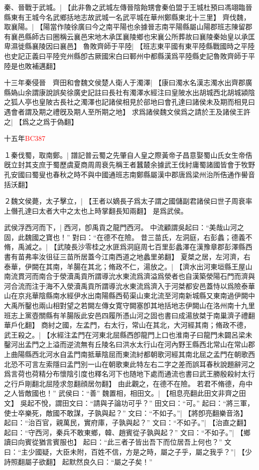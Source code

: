 秦、晉戰于武城。|{
	【此非魯之武城左傳晉陰飴甥會秦伯盟于王城杜預曰馮翊臨晉縣東有王城今名武鄉括地志故武城一名武平城在華州鄭縣東北十三里】}
齊伐魏，取襄陽。|{
	【陽當作陵徐廣曰今之南平陽也余據晉志南平陽縣屬山陽郡班志陳留郡有襄邑縣師古曰圈稱云襄邑宋地木承匡襄陵鄉也宋襄公所葬故曰襄陵秦始皇以承匡卑濕徙縣襄陵因曰襄邑】}
魯敗齊師于平陸|{
	【班志東平國有東平陸縣戰國時之平陸也史記正義曰平陸兖州縣卽古厥國宋白曰鄆州中都縣漢爲平陸縣史記魯敗齊師于平陸是也敗補邁翻】}
\par
十三年秦侵晉　齊田和會魏文侯楚人衛人于濁澤|{
	【康曰濁水名漢志濁水出齊郡廣縣媯山余謂康說誤矣徐廣史記註曰長社有濁澤水經注曰皇陂水出胡城西北胡城潁陰之狐人亭也皇陂古長社之濁澤也記諸侯相見於郤地曰會孔達曰諸侯未及期而相見曰遇會者謂及期之禮旣及期人至所期之地】}
求爲諸侯魏文侯爲之請於王及諸侯王許之|{
	【爲之之爲于偽翻】}

十五年\textcolor{red}{\small{}BC387}

１秦伐蜀，取南鄭。|{
	譜記普云蜀之先肇自人皇之際黃帝子昌意娶蜀山氏女生帝俈旣立封其支庶于蜀歷虞夏商周周衰先稱王者蠶樷余據武王伐紂庸蜀諸國皆會于牧野孔安國曰蜀叟也春秋之時不與中國通班志南鄭縣屬漢中郡唐爲梁州治所俈通作嚳音括沃翻】
	}


２魏文侯薨，太子擊立，|{
	【王者以嫡長子爲太子謂之國儲副君諸侯曰世子周衰率上僭孔達曰太者大中之太也上時掌翻長知兩翻】}
是爲武侯。

武侯浮西河而下，|{
	西河，卽禹貢之龍門西河。
	}
中流顧謂吳起曰：“美哉山河之固，此魏國之寶也！”
對曰：“在德不在險。
	昔三苗氏，左洞庭，右彭蠡；德義不脩，禹滅之。|{
	【武陵長沙零桂之水匪爲洞庭周七百里彭蠡澤在漢豫章郡彭澤縣西書有苗弗率汝徂征三苗所居蓋今江南西道之地蠡里弟翻】}
	夏桀之居，左河濟，右泰華，伊闕在其南，羊腸在其北；脩政不仁，湯放之。|{
	【濟水出河東垣縣王屋山南流貫河而南合于滎瀆禹貢所謂導沇水東流爲濟溢爲滎者也自漢築滎陽石門而濟與河合流而注于海不入滎瀆禹貢所謂導沇水東流爲濟入于河桀都安邑蓋恃以爲險泰華山在京兆華陰縣南水經伊水出南陽縣西荀渠山東北流至河南新城縣又東南過伊闕中大禹所鑿也兩山相對望之若闕左傳女寛守闕塞卽其地括地志伊闕山在洛州南十九里班志上黨壺關縣有羊腸阪此安邑四履所憑山河之固也書曰成湯放桀于南巢濟子禮翻華戶化翻】}
	商紂之國，左孟門，右太行，常山在其北，大河經其南；脩政不德，武王殺之。|{
	【水經注孟門在河東北屈縣西卽龍門上口也淮南子曰龍門未闢呂梁未鑿河出孟門之上溢而逆流無有丘陵名曰洪水太行山在河內野王縣西北常山在常山郡上曲陽縣西北河水自孟門南抵華陰屈而東流紂都朝歌河經其南北屈之孟門在朝歌西北恐不可言左索隱曰孟門別一山在朝歌東此特左右二字之差而誤耳春秋說題辭河之爲言荷也荷精分布懷陰引度也釋名河下也随地下處而通流也書曰武王勝殷殺紂太行之行戶剛翻北屈陸求忽翻顔居勿翻】
	}
	由此觀之，在德不在險。
	若君不脩德，舟中之人皆敵國也！”
武侯曰：“善”
魏置相，相田文。|{
	【相息亮翻此田文非齊之田文】}
吳起不悅，謂田文曰：“請與子論功可乎？”
田文曰：“可。”
起曰：“將三軍，使士卒樂死，敵國不敢謀，子孰與起？”
文曰：“不如子。”|{
	【將卽亮翻樂音洛】}
起曰：“治百官，親萬民，實府庫，子孰與起？”
文曰：“不如子。”|{
	【治直之翻】
	}
起曰：“守西河，秦兵不敢東鄉，韓、趙賓從子孰與起？”
文曰：“不如子。”|{
	【鄉讀曰向賓從猶言賓服也】}
起曰：“此三者子皆出吾下而位居吾上何也？”
文曰：“主少國疑，大臣未附，百姓不信，方是之時，屬之子乎，屬之我乎？”|{
	【少詩照翻屬子欲翻】}
起默然良久曰：“屬之子矣！”


